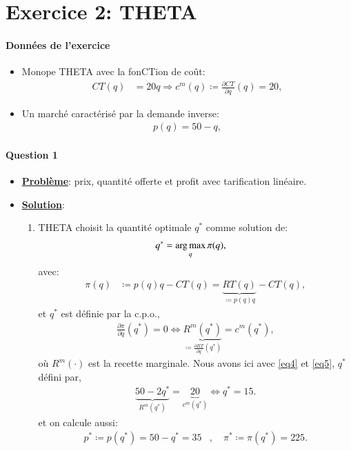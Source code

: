 \documentclass[notes, ignorenonframetext, compress, 9pt, xcolor=svgnames, aspectratio=169]{beamer}
\begin{document}
\section{Exercice 2: THETA }
\frame{\sectionpage}
\begin{frame}
[allowframebreaks]{\insertsection}
\framesubtitle{Données de l'exercice \\}
\begin{itemize}
    \item Monope THETA avec la fonCTion de coût:
    \begin{align}
    CT(q) &= 20q \Rightarrow c^m(q) \coloneqq \frac{\partial CT}{\partial q}(q) = 20,
    \label{eq4}
    \end{align}
   \item Un marché caractérisé par la demande inverse:
   \begin{align}
     p(q)=50-q,
     \label{eq5}
   \end{align}
\end{itemize}
    \end{frame}
    
     \begin{frame}
  [allowframebreaks]{\insertsection}
  \framesubtitle{Question 1\\}
  \begin{itemize}
\item \textbf{\underline{Problème}}:  prix, quantité offerte et profit avec tarification linéaire.
    \item \textbf{\underline{Solution}}: 
  \begin{enumerate}[$\cdot$]
    \item THETA choisit la quantité optimale $q^*$ comme solution de:
    \begin{align*}
      q^* &= \argmax_q \pi(q),
    \end{align*}
    avec:
    \begin{align*}
      \pi(q) &\coloneqq p(q)q - CT(q) = \underbrace{RT(q)}_{\coloneqq p(q)q} - CT(q),
    \end{align*}
    et $q^*$ est définie par la c.p.o.,
    \begin{align}
      \frac{\partial \pi}{\partial q}(q^*) = 0 \Leftrightarrow \underbrace{R^m(q^*)}_{\coloneqq \frac{\partial RT}{\partial q}(q^*)} 
      = c^m(q^*),
      \label{eq6}
    \end{align}
    où  $R^m(\cdot)$ est la recette marginale. 
    \medskip
    Nous avons ici avec \eqref{eq4} et \eqref{eq5}, $q^*$ défini par,
    \begin{align*}
      \underbrace{50-2q^*}_{R^m(q^*)} = \underbrace{20}_{c^m(q^*)} \Leftrightarrow q^* = 15.
    \end{align*}
    et on calcule aussi:
    \begin{align*}
      p^* \coloneqq p(q^*) = 50-q^* = 35 &, \quad \pi^* \coloneqq\pi(q^*) = 225.
    \end{align*}
  \end{enumerate}
  \end{itemize}
    \end{frame}
    
\end{document}
